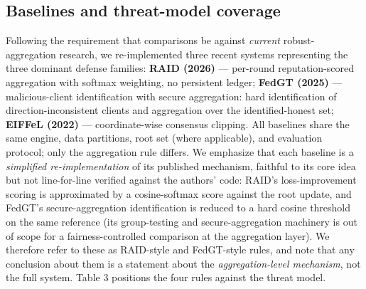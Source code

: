 \documentclass[cmc,article,submit,moreauthors,pdftex]{Definitions/tsp}
\begin{document}
\subsection{Baselines and threat-model coverage}\label{sec:baselines-and-threat-model-coverage}

Following the requirement that comparisons be against \emph{current} robust-aggregation research, we re-implemented three recent systems representing the three dominant defense families: \textbf{RAID (2026)} \cite{ref-23} --- per-round reputation-scored aggregation with softmax weighting, no persistent ledger; \textbf{FedGT (2025)} \cite{ref-41} --- malicious-client identification with secure aggregation: hard identification of direction-inconsistent clients and aggregation over the identified-honest set; \textbf{EIFFeL (2022)} \cite{ref-22} --- coordinate-wise consensus clipping. All baselines share the same engine, data partitions, root set (where applicable), and evaluation protocol; only the aggregation rule differs. We emphasize that each baseline is a \emph{simplified re-implementation} of its published mechanism, faithful to its core idea but not line-for-line verified against the authors' code: RAID's loss-improvement scoring is approximated by a cosine-softmax score against the root update, and FedGT's secure-aggregation identification is reduced to a hard cosine threshold on the same reference (its group-testing and secure-aggregation machinery is out of scope for a fairness-controlled comparison at the aggregation layer). We therefore refer to these as RAID-style and FedGT-style rules, and note that any conclusion about them is a statement about the \emph{aggregation-level mechanism}, not the full system. Table 3 positions the four rules against the threat model.
\end{document}
